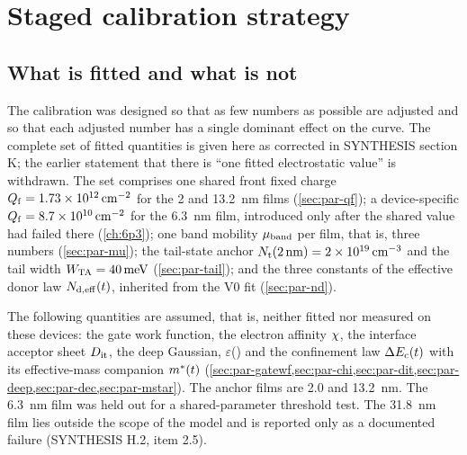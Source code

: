 \section{Staged calibration strategy}\label{sec:cal-strategy}

\subsection{What is fitted and what is not}\label{sec:cal-free-set}
The calibration was designed so that as few numbers as possible are adjusted and so that each adjusted number has a single dominant effect on the curve. The complete set of fitted quantities is given here as corrected in SYNTHESIS section K; the earlier statement that there is ``one fitted electrostatic value'' is withdrawn. The set comprises one shared front fixed charge $Q_{\mathrm{f}}=\SI{1.73e12}{cm^{-2}}$ for the 2 and 13.2~nm films (\cref{sec:par-qf}); a device-specific $Q_{\mathrm{f}}=\SI{8.7e10}{cm^{-2}}$ for the 6.3~nm film, introduced only after the shared value had failed there (\cref{ch:6p3}); one band mobility $\mu_{\mathrm{band}}$ per film, that is, three numbers (\cref{sec:par-mu}); the tail-state anchor $N_{\mathrm{t}}(\SI{2}{nm})=\SI{2e19}{cm^{-3}}$ and the tail width $W_{\mathrm{TA}}=\SI{40}{meV}$ (\cref{sec:par-tail}); and the three constants of the effective donor law $N_{\mathrm{d,eff}}(t)$, inherited from the V0 fit (\cref{sec:par-nd}).

The following quantities are assumed, that is, neither fitted nor measured on these devices: the gate work function, the electron affinity $\chi$, the interface acceptor sheet $D_{\mathrm{it}}$, the deep Gaussian, $\varepsilon$(\AlO) and the confinement law $\Delta E_{\mathrm{c}}(t)$ with its effective-mass companion $m^{*}(t)$ (\cref{sec:par-gatewf,sec:par-chi,sec:par-dit,sec:par-deep,sec:par-dec,sec:par-mstar}). The anchor films are 2.0 and 13.2~nm. The 6.3~nm film was held out for a shared-parameter threshold test. The 31.8~nm film lies outside the scope of the model and is reported only as a documented failure (SYNTHESIS H.2, item 2.5).

